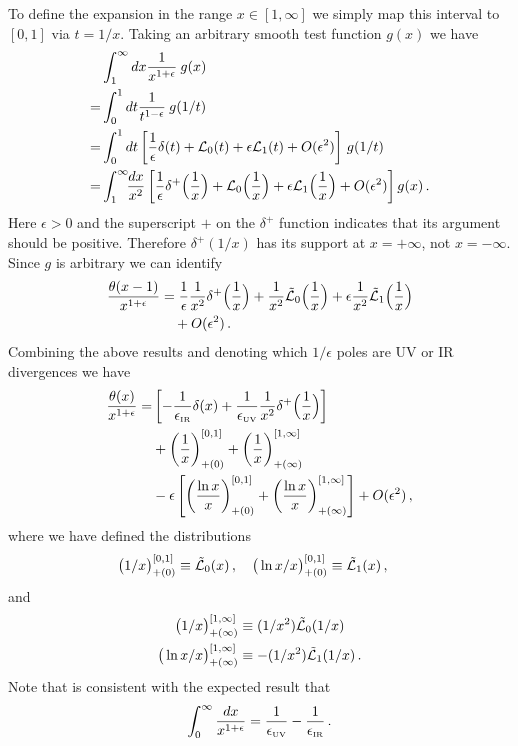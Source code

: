 To define the expansion in the range $x\in [1,\infty]$ we simply map this interval to $[0,1]$ via $t=1/x$. Taking an arbitrary smooth test function $g(x)$ we have
\begin{align}
	&\int_1^\infty dx {1\over x^{1+\epsilon}} \: g(x)
    \\
	=& \int_0^1 dt {1\over t^{1-\epsilon}}  \:  g(1/t)
   \nonumber\\
	=& \int_0^1 dt \left[{1\over\epsilon}\delta(t)+ \mathcal{L}_0(t) + \epsilon \mathcal{L}_1(t)+ O(\epsilon^2)\right] \, g(1/t)
    \nonumber\\
	=& \int_1^\infty\!\! {dx\over x^2}\left[{1\over\epsilon}\delta^+\Bigl({1\over x}\Bigr)+ \mathcal{L}_0\Bigl({1\over x}\Bigr) + \epsilon \mathcal{L}_1\Bigl({1\over x}\Bigr)+ O(\epsilon^2)\right] g(x)
   \,.\nonumber
\end{align}
Here $\epsilon>0$ and the superscript $+$ on the $\delta^+$ function indicates that its argument should be positive. Therefore $\delta^+(1/x)$ has its support at $x=+\infty$, not $x=-\infty$.  Since $g$ is arbitrary we can identify
\begin{align}
  {\theta(x-1)\over x^{1+\epsilon}}
   &= {1\over\epsilon}{1\over x^2}\delta^+\Bigl({1\over x}\Bigr)
   + \frac{1}{x^2} \tilde{\mathcal{L}}_0\Bigl({1\over x}\Bigr)
   + \epsilon \frac{1}{x^2} \tilde{\mathcal{L}}_1\Bigl({1\over x}\Bigr)
  \nonumber\\
  &\quad + O(\epsilon^2)\,.
\end{align}
Combining the above results and denoting which $1/\epsilon$ poles are UV or IR divergences we have
\begin{align} \label{eq:expansion}
	{\theta(x)\over x^{1+\epsilon}}
 = & \left[-\frac{1}{\epsilon_{\mbox{\tiny IR}}}\delta(x) + \frac{1}{\epsilon_{\mbox{\tiny UV}}} {1\over  x^2}\delta^+\Bigl({1\over x}\Bigr)\right]
    \\
    & + \left({1\over x}\right)^{[0,1]}_{+(0)}+\left({1\over x}\right)^{[1,\infty]}_{+(\infty)}
  \nonumber\\
	& - \epsilon\left[\left({\ln x\over x}\right)^{[0,1]}_{+(0)}+\left({\ln x\over x}\right)^{[1,\infty]}_{+(\infty)}\right] + O(\epsilon^2)
   \,, \nonumber
\end{align}
where we have defined the distributions
\begin{align}
  \big(1/x\big)_{+(0)}^{[0,1]} &\equiv  \tilde{{\cal L}}_0(x)
  \,,  \quad
  \big(\ln x/x\big)_{+(0)}^{[0,1]} \equiv  \tilde{{\cal L}}_1(x)
  \,,
\end{align}
and
\begin{align}\label{eq:plusinfinity}
 \big(1/x\big)_{+(\infty)}^{[1,\infty]} &\equiv (1/x^2) \tilde{{\cal L}}_0(1/x)
   \, \\
\big(\ln x/x\big)_{+(\infty)}^{[1,\infty]} &\equiv -(1/x^2) \tilde{{\cal L}}_1(1/x)
   \,. \nonumber
\end{align}
Note that  is consistent with the expected result that
\begin{align}
 \int_0^\infty \frac{dx}{x^{1+\epsilon}}
 = \frac{1}{\epsilon_{\mbox{\tiny UV}} }
  -\frac{1}{\epsilon_{\mbox{\tiny IR}} } \,.
\end{align}


\begingroup
\makeatletter

\makeatother
\endgroup
